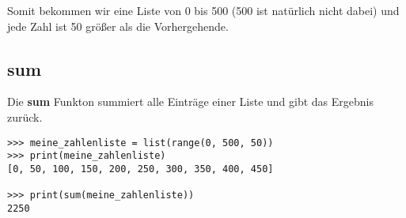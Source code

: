 Somit bekommen wir eine Liste von 0 bis 500 (500 ist natürlich nicht dabei) und jede Zahl ist 50 größer als die Vorhergehende.

\subsection*{sum}

Die \textbf{sum} Funkton summiert alle Einträge einer Liste und gibt das Ergebnis zurück.


\begin{Verbatim}[frame=single]
>>> meine_zahlenliste = list(range(0, 500, 50))
>>> print(meine_zahlenliste)
[0, 50, 100, 150, 200, 250, 300, 350, 400, 450]

>>> print(sum(meine_zahlenliste))
2250
\end{Verbatim}

\newpage
